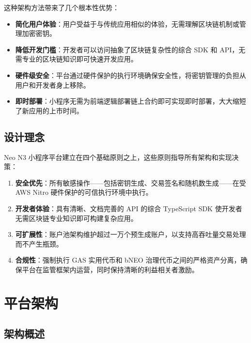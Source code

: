 \documentclass[11pt,a4paper]{article}
\begin{document}
这种架构方法带来了几个根本性优势：

\begin{itemize}
    \item \textbf{简化用户体验}：用户受益于与传统应用相似的体验，无需理解区块链机制或管理加密密钥。
    \item \textbf{降低开发门槛}：开发者可以访问抽象了区块链复杂性的综合 SDK 和 API，无需专业的区块链知识即可快速开发应用。
    \item \textbf{硬件级安全}：平台通过硬件保护的执行环境确保安全性，将密钥管理的负担从用户和开发者身上移除。
    \item \textbf{即时部署}：小程序无需为前端逻辑部署链上合约即可实现即时部署，大大缩短了新应用的上市时间。
\end{itemize}

\subsection{设计理念}

Neo N3 小程序平台建立在四个基础原则之上，这些原则指导所有架构和实现决策：

\begin{enumerate}
    \item \textbf{安全优先}：所有敏感操作——包括密钥生成、交易签名和随机数生成——在受 AWS Nitro 硬件保护的可信执行环境中执行。
    \item \textbf{开发者体验}：具有清晰、文档完善的 API 的综合 TypeScript SDK 使开发者无需区块链专业知识即可构建复杂应用。
    \item \textbf{可扩展性}：账户池架构维护超过一万个预生成账户，以支持高吞吐量交易处理而不产生瓶颈。
    \item \textbf{合规性}：强制执行 GAS 实用代币和 bNEO 治理代币之间的严格资产分离，确保平台在监管框架内运营，同时保持清晰的利益相关者激励。
\end{enumerate}

\newpage
\section{平台架构}

\subsection{架构概述}
\end{document}

